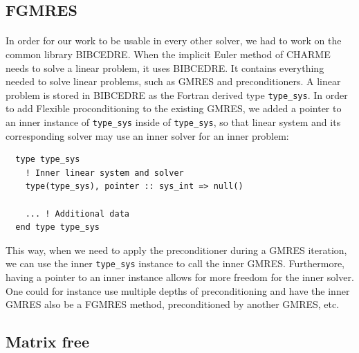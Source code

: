     \subsection{FGMRES}

      \paragraph{}
      In order for our work to be usable in every other solver, we had to work on the common library BIBCEDRE.
      When the implicit Euler method of CHARME needs to solve a linear problem, it uses BIBCEDRE.
      It contains everything needed to solve linear problems, such as GMRES and preconditioners.
      A linear problem is stored in BIBCEDRE as the Fortran derived type \texttt{type_sys}.
      In order to add Flexible proconditioning to the existing GMRES, we added a pointer to an inner instance of \texttt{type_sys} inside of \texttt{type_sys}, so that linear system and its corresponding solver may use an inner solver for an inner problem:
\begin{verbatim}
  type type_sys
    ! Inner linear system and solver
    type(type_sys), pointer :: sys_int => null()

    ... ! Additional data
  end type type_sys
\end{verbatim}
      This way, when we need to apply the preconditioner during a GMRES iteration, we can use the inner \texttt{type_sys} instance to call the inner GMRES.
      Furthermore, having a pointer to an inner instance allows for more freedom for the inner solver.
      One could for instance use multiple depths of preconditioning and have the inner GMRES also be a FGMRES method, preconditioned by another GMRES, etc.


    \subsection{Matrix free}

